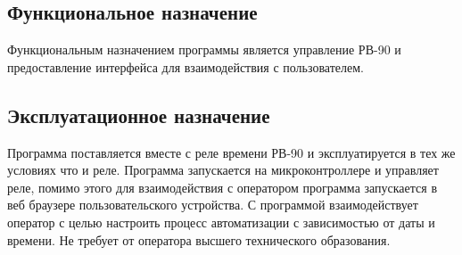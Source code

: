 \subsection{Функциональное назначение}
Функциональным назначением программы является управление РВ-90 и предоставление интерфейса для взаимодействия с пользователем.


\subsection{Эксплуатационное назначение}
Программа поставляется вместе с реле времени РВ-90 и эксплуатируется в тех же условиях что и реле. Программа запускается на микроконтроллере и управляет реле, помимо этого для взаимодействия с оператором программа запускается в веб браузере пользовательского устройства. С программой взаимодействует оператор с целью настроить процесс автоматизации с зависимостью от даты и времени. Не требует от оператора высшего технического образования. 